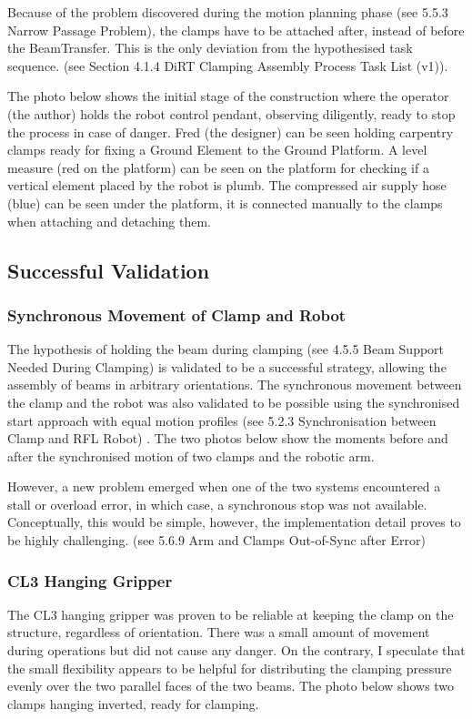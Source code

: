 \begin{itemize}
\begin{enumerate}
\begin{enumerate}
Because of the problem discovered during the motion planning phase (see 5.5.3 Narrow Passage Problem), the clamps have to be attached after, instead of before the BeamTransfer. This is the only deviation from the hypothesised task sequence. (see Section 4.1.4 DiRT Clamping Assembly Process Task List (v1)). 

The photo below shows the initial stage of the construction where the operator (the author) holds the robot control pendant, observing diligently, ready to stop the process in case of danger. Fred (the designer) can be seen holding carpentry clamps ready for fixing a Ground Element to the Ground Platform. A level measure (red on the platform) can be seen on the platform for checking if a vertical element placed by the robot is plumb. The compressed air supply hose (blue) can be seen under the platform, it is connected manually to the clamps when attaching and detaching them.

\subsection{Successful Validation}
\subsubsection{Synchronous Movement of Clamp and Robot}

The hypothesis of holding the beam during clamping (see 4.5.5 Beam Support Needed During Clamping) is validated to be a successful strategy, allowing the assembly of beams in arbitrary orientations. The synchronous movement between the clamp and the robot was also validated to be possible using the synchronised start approach with equal motion profiles (see 5.2.3 Synchronisation between Clamp and RFL Robot) . The two photos below show the moments before and after the synchronised motion of two clamps and the robotic arm.
 
However, a new problem emerged when one of the two systems encountered a stall or overload error, in which case, a synchronous stop was not available. Conceptually, this would be simple, however, the implementation detail proves to be highly challenging. (see 5.6.9 Arm and Clamps Out-of-Sync after Error)
\subsubsection{CL3 Hanging Gripper}

The CL3 hanging gripper was proven to be reliable at keeping the clamp on the structure, regardless of orientation. There was a small amount of movement during operations but did not cause any danger. On the contrary, I speculate that the small flexibility appears to be helpful for distributing the clamping pressure evenly over the two parallel faces of the two beams.  The photo below shows two clamps hanging inverted, ready for clamping.


\end{enumerate}
\end{enumerate}
\end{itemize}

